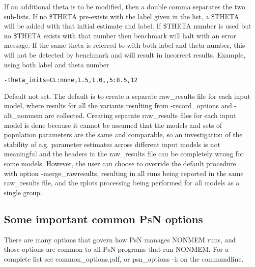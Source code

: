 \begin{optionlist}
If an additional theta is to be modified, then a double comma separates 
the two sub-lists. If no \$THETA pre-exists with the label given in the list,
a \$THETA will be added with that initial estimate and label. 
If \$THETA number is used but no \$THETA exists with that number then benchmark will halt with an
error message.
If the same theta is referred to with both label and theta number, this will not be detected
by benchmark and will result in incorrect results.
Example, using both label and theta number
\begin{verbatim}
-theta_inits=CL:none,1.5,1.0,,5:8.5,12
\end{verbatim}
\nextopt
{}
Default not set. The default is to create a separate raw\_results file for each input model,
where results for all the variants resulting from -record\_options and -alt\_nonmem
are collected. Creating separate raw\_results files for each input model is done because
it cannot be assumed that the models and sets of population parameters are the same and comparable,
so an investigation of the stability of e.g. parameter estimates across different input models
is not meaningful and the headers in the raw\_results file can be completely wrong for some models. 
However, the user can choose to override the default procedure
with option -merge\_rawresults, resulting in all runs being reported in the same raw\_results file,
and the rplots processing being performed for all models as a single group.
\nextopt
\end{optionlist}

\subsection{Some important common PsN options}
There are many options that govern how PsN manages NONMEM runs, and
those options are common to all PsN programs that run NONMEM.
For a complete list see common\_options.pdf, 
or psn\_options -h on the commandline.

